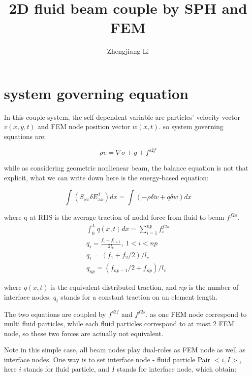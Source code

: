\documentclass[11pt]{article}
\begin{document}
\title{2D fluid beam couple by SPH and FEM}

\author{Zhengjiang Li}

\date{}

\maketitle



\section {system governing equation}

In this couple system, the self-dependent variable are particles' velocity vector $v(x,y,t)$ and FEM node position vector $w(x,t)$. so system governing equations are:

   $$	\rho  \dot{v} = \nabla \sigma + g + f^{s2f} $$ 
	
while as considering geometric nonlienear beam, the balance equation is not that explicit, what we can write down here is the energy-based equation:

$$\int (S_{xx} \delta E_{xx}^T) dx =  \int (-\rho \delta \ddot{w} + q \delta w ) dx $$
  
where q at RHS is the average traction of nodal force from fluid to beam $f^{f2s}$.
\begin{subequations}
\begin{align}
 \int_0^L q(x,t) dx = \sum_{i=1}^{np} f^{f2s}_i \\
q_i = \frac{f_i + f_{i+1}}{2l_e}, \  1< i < np \\
q_1 = (f_1 + f_2/2)/ l_e \\
q_{np} = (f_{np-1}/2 + f_{np})/l_e 
\end{align}
\end{subequations}

where $ q(x,t)$ is the equivalent distributed traction, and $np$ is the number of interface nodes. $q_i$ stands for a constant traction on an element length. 


The two equations are coupled by $f^{s2f}$ and $f^{f2s}$. as one FEM node correspond to multi fluid particles, while each fluid particles correspond to at most 2 FEM node, so these two forces are actually not equivalent.


Note in this simple case, all beam nodes play dual-roles as FEM node as well as interface nodes. One way is to set interface node - fluid particle Pair $<i, I>$, here $i$ stands for fluid particle, and $I$ stands for interface node, which obtain:
\end{document}
